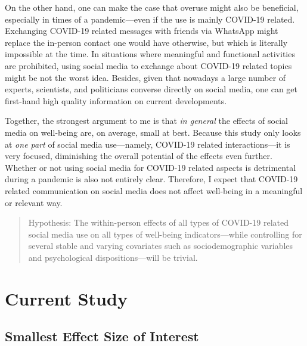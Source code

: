 \documentclass[
  english,
  man,mask,floatsintext]{apa6}
\begin{document}
On the other hand, one can make the case that overuse might also be beneficial, especially in times of a pandemic---even if the use is mainly COVID-19 related.
Exchanging COVID-19 related messages with friends via WhatsApp might replace the in-person contact one would have otherwise, but which is literally impossible at the time.
In situations where meaningful and functional activities are prohibited, using social media to exchange about COVID-19 related topics might be not the worst idea.
Besides, given that nowadays a large number of experts, scientists, and politicians converse directly on social media, one can get first-hand high quality information on current developments.

Together, the strongest argument to me is that \emph{in general} the effects of social media on well-being are, on average, small at best.
Because this study only looks at \emph{one part} of social media use---namely, COVID-19 related interactions---it is very focused, diminishing the overall potential of the effects even further.
Whether or not using social media for COVID-19 related aspects is detrimental during a pandemic is also not entirely clear.
Therefore, I expect that COVID-19 related communication on social media does not affect well-being in a meaningful or relevant way.

\begin{quote}
Hypothesis: The within-person effects of all types of COVID-19 related social media use on all types of well-being indicators---while controlling for several stable and varying covariates such as sociodemographic variables and psychological dispositions---will be trivial.
\end{quote}

\hypertarget{current-study}{%
\section{Current Study}\label{current-study}}

\hypertarget{smallest-effect-size-of-interest}{%
\subsection{Smallest Effect Size of Interest}\label{smallest-effect-size-of-interest}}
\end{document}
